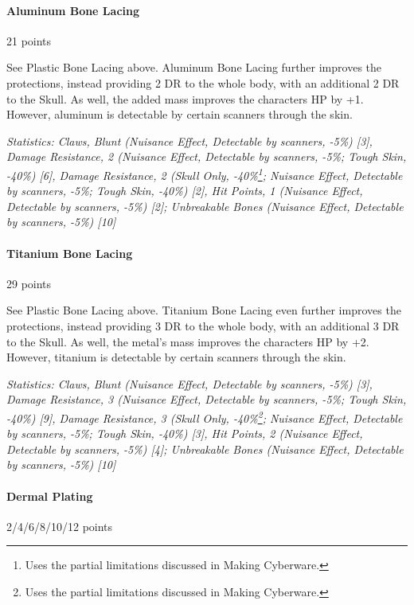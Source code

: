 \begin{multicols*}{3}
	\paragraph{Aluminum Bone Lacing}
	\begin{flushright}
		21 points
	\end{flushright}
	
	See Plastic Bone Lacing above. Aluminum Bone Lacing further improves the protections, instead providing 2 DR to the whole body, with an additional 2 DR to the Skull. As well, the added mass improves the characters HP by +1. However, aluminum is detectable by certain scanners through the skin.
	
	\textit{\textcolor{OliveGreen}{Statistics: Claws, Blunt (Nuisance Effect, Detectable by scanners,  -5\%) [3], Damage Resistance, 2 (Nuisance Effect, Detectable by scanners, -5\%; Tough Skin, -40\%) [6], Damage Resistance, 2 (Skull Only, -40\%\footnote {Uses the partial limitations discussed in Making Cyberware.}; Nuisance Effect, Detectable by scanners, -5\%; Tough Skin, -40\%) [2], Hit Points, 1 (Nuisance Effect, Detectable by scanners,  -5\%) [2]; Unbreakable Bones (Nuisance Effect, Detectable by scanners,  -5\%) [10]}}
	
	\paragraph{Titanium Bone Lacing}
	\begin{flushright}
		29 points
	\end{flushright}
	
	See Plastic Bone Lacing above. Titanium Bone Lacing even further improves the protections, instead providing 3 DR to the whole body, with an additional 3 DR to the Skull. As well, the metal's mass improves the characters HP by +2. However, titanium is detectable by certain scanners through the skin.
	
	\textit{\textcolor{OliveGreen}{Statistics: Claws, Blunt (Nuisance Effect, Detectable by scanners,  -5\%) [3], Damage Resistance, 3 (Nuisance Effect, Detectable by scanners, -5\%; Tough Skin, -40\%) [9], Damage Resistance, 3 (Skull Only, -40\%\footnote {Uses the partial limitations discussed in Making Cyberware.}; Nuisance Effect, Detectable by scanners, -5\%; Tough Skin, -40\%) [3], Hit Points, 2 (Nuisance Effect, Detectable by scanners,  -5\%) [4]; Unbreakable Bones (Nuisance Effect, Detectable by scanners,  -5\%) [10]}}
	
	\paragraph{Dermal Plating}
	\begin{flushright}
		2/4/6/8/10/12 points
	\end{flushright}
	

\end{multicols*}
